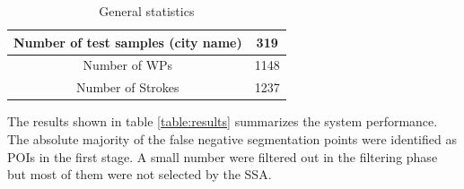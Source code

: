\documentclass[10pt, conference, compsocconf]{IEEEtran}
\begin{document}
\begin{table}[h]
\caption{General statistics}
\renewcommand{\arraystretch}{1.2}
\begin{tabular}{ | c | c | }
  \hline
  Number of test samples (city name) & 319 \\
  \hline
  Number of WPs & 1148 \\
  \hline
  Number of Strokes & 1237 \\
  \hline
\end{tabular}
\centering
\label{table:general_stats} 
\end{table}

The results shown in table \ref{table:results} summarizes the system performance. The absolute majority of the false negative segmentation points were identified as POIs in the first stage. A small number were filtered out in the filtering phase but most of them were not selected by the SSA.

%
\end{document}
